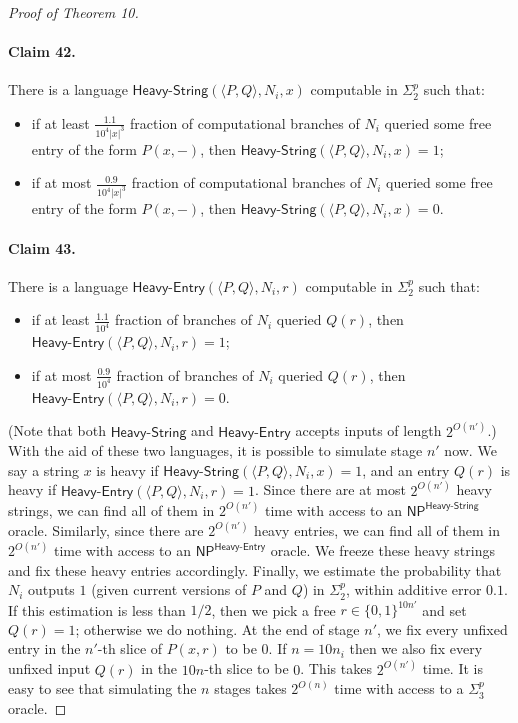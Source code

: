 \documentclass[10pt,a4paper]{article}
\begin{document}
\begin{proof}[Proof of Theorem 10]
\paragraph{Claim 42.} There is a language $\mathsf{Heavy\text{-}String}(\langle P,Q\rangle,N_i,x)$ computable in $\Sigma^p_2$ such that:
\begin{itemize}
\item if at least $\frac{1.1}{10^4|x|^3}$ fraction of computational branches of $N_i$ queried some free entry of the form $P(x,-)$, then $\mathsf{Heavy\text{-}String}(\langle P,Q\rangle,N_i,x)=1$;
\item if at most $\frac{0.9}{10^4|x|^3}$ fraction of computational branches of $N_i$ queried some free entry of the form $P(x,-)$, then $\mathsf{Heavy\text{-}String}(\langle P,Q\rangle,N_i,x)=0$.
\end{itemize}
\paragraph{Claim 43.} There is a language $\mathsf{Heavy\text{-}Entry}(\langle P,Q\rangle,N_i,r)$ computable in $\Sigma^p_2$ such that:
\begin{itemize}
\item if at least $\frac{1.1}{10^4}$ fraction of branches of $N_i$ queried $Q(r)$, then $\mathsf{Heavy\text{-}Entry}(\langle P,Q\rangle,N_i,r)=1$;
\item if at most $\frac{0.9}{10^4}$ fraction of branches of $N_i$ queried $Q(r)$, then $\mathsf{Heavy\text{-}Entry}(\langle P,Q\rangle,N_i,r)=0$.
\end{itemize}
(Note that both $\mathsf{Heavy\text{-}String}$ and $\mathsf{Heavy\text{-}Entry}$ accepts inputs of length $2^{O(n')}$.)
With the aid of these two languages, it is possible to simulate stage $n'$ now. We say a string $x$ is heavy if $\mathsf{Heavy\text{-}String}(\langle P,Q\rangle,N_i,x)=1$, and an entry $Q(r)$ is heavy if $\mathsf{Heavy\text{-}Entry}(\langle P,Q\rangle,N_i,r)=1$. Since there are at most $2^{O(n')}$ heavy strings, we can find all of them in $2^{O(n')}$ time with access to an $\mathsf{NP}^{\mathsf{Heavy\text{-}String}}$ oracle. Similarly, since there are $2^{O(n')}$ heavy entries, we can find all of them in $2^{O(n')}$ time with access to an $\mathsf{NP}^{\mathsf{Heavy\text{-}Entry}}$ oracle. We freeze these heavy strings and fix these heavy entries accordingly.
Finally, we estimate the probability that $N_i$ outputs $1$ (given current versions of $P$ and $Q$) in $\Sigma^p_2$, within additive error $0.1$. If this estimation is less than $1/2$, then we pick a free $r\in\{0,1\}^{10n'}$ and set $Q(r)=1$; otherwise we do nothing.
At the end of stage $n'$, we fix every unfixed entry in the $n'$-th slice of $P(x,r)$ to be $0$. If $n=10n_i$ then we also fix every unfixed input $Q(r)$ in the $10n$-th slice to be $0$. This takes $2^{O(n')}$ time.
It is easy to see that simulating the $n$ stages takes $2^{O(n)}$ time with access to a $\Sigma^p_3$ oracle.
\end{proof}
\end{document}
